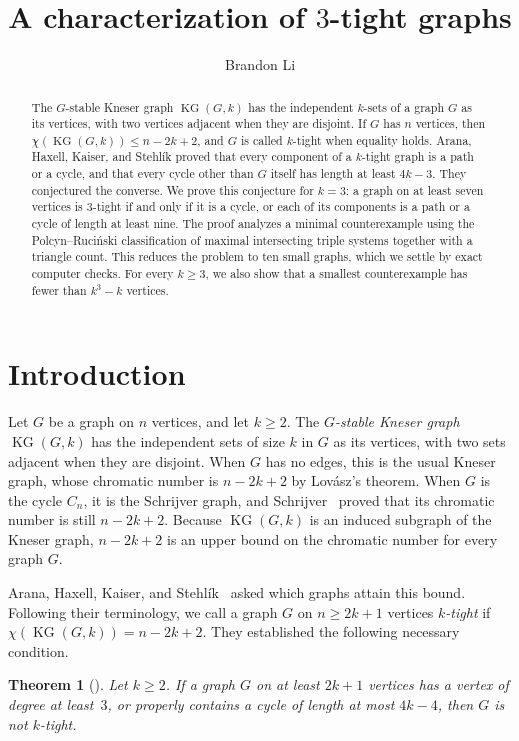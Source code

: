 \documentclass[11pt]{amsart}
\title{A characterization of $3$-tight graphs}
\author{Brandon Li}
\newtheorem{theorem}{Theorem}[section]
\theoremstyle{definition}
\theoremstyle{remark}
\numberwithin{equation}{section}
\newcommand{\KG}{\operatorname{KG}}
\begin{document}
\begin{abstract}
The $G$-stable Kneser graph $\KG(G,k)$ has the independent $k$-sets of a graph
$G$ as its vertices, with two vertices adjacent when they are disjoint. If $G$
has $n$ vertices, then $\chi(\KG(G,k))\le n-2k+2$, and $G$ is called $k$-tight
when equality holds. Arana, Haxell, Kaiser, and Stehl\'ik proved that every
component of a $k$-tight graph is a path or a cycle, and that every cycle other
than $G$ itself has length at least $4k-3$. They conjectured the converse. We
prove this conjecture for $k=3$: a graph on at least seven vertices is
$3$-tight if and only if it is a cycle, or each of its components is a path or
a cycle of length at least nine. The proof analyzes a minimal counterexample
using the Polcyn--Ruci\'nski classification of maximal intersecting triple
systems together with a triangle count. This reduces the problem to ten small
graphs, which we settle by exact computer checks. For every $k\ge3$, we also
show that a smallest counterexample has fewer than $k^3-k$ vertices.
\end{abstract}

\maketitle

\section{Introduction}

Let $G$ be a graph on $n$ vertices, and let $k\ge2$. The \emph{$G$-stable
Kneser graph} $\KG(G,k)$ has the independent sets of size $k$ in $G$ as its
vertices, with two sets adjacent when they are disjoint. When $G$ has no edges,
this is the usual Kneser graph, whose chromatic number is $n-2k+2$ by
Lov\'asz's theorem. When $G$ is the cycle $C_n$, it is the Schrijver graph, and
Schrijver~\cite{Schrijver} proved that its chromatic number is still $n-2k+2$.
Because $\KG(G,k)$ is an induced subgraph of the Kneser graph, $n-2k+2$ is an
upper bound on the chromatic number for every graph $G$.

Arana, Haxell, Kaiser, and Stehl\'ik~\cite{AHKS} asked which graphs attain this
bound. Following their terminology, we call a graph $G$ on $n\ge2k+1$ vertices
\emph{$k$-tight} if $\chi(\KG(G,k))=n-2k+2$. They established the following
necessary condition.

\begin{theorem}[{\cite[Theorem~1.2]{AHKS}}]\label{thm:necessary}
Let $k\ge2$. If a graph $G$ on at least $2k+1$ vertices has a vertex of degree
at least~$3$, or properly contains a cycle of length at most $4k-4$, then $G$
is not $k$-tight.
\end{theorem}
\end{document}
